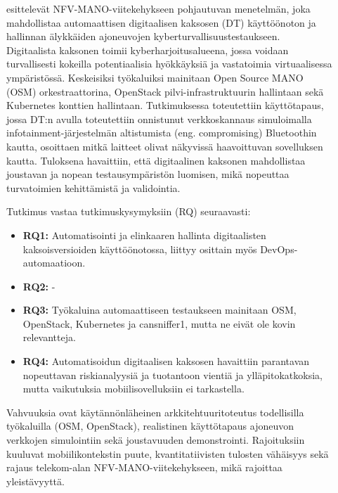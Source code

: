 \documentclass[bscthesis,finnish,oneside,biblatex]{uefcsthesis}
\begin{document}
    \begin{description}
        \item[\cite{grasselli2023_digitaltwin}] esittelevät NFV-MANO-viitekehykseen pohjautuvan menetelmän, joka mahdollistaa automaattisen digitaalisen kaksosen (DT) käyttöönoton ja hallinnan älykkäiden ajoneuvojen kyberturvallisuustestaukseen. Digitaalista kaksonen toimii kyberharjoitusalueena, jossa voidaan turvallisesti kokeilla potentiaalisia hyökkäyksiä ja vastatoimia virtuaalisessa ympäristössä. Keskeisiksi työkaluiksi mainitaan Open Source MANO (OSM) orkestraattorina, OpenStack pilvi-infrastruktuurin hallintaan sekä Kubernetes konttien hallintaan. Tutkimuksessa toteutettiin käyttötapaus, jossa DT:n avulla toteutettiin onnistunut verkkoskannaus simuloimalla infotainment-järjestelmän altistumista (eng. compromising) Bluetoothin kautta, osoittaen mitkä laitteet olivat näkyvissä haavoittuvan sovelluksen kautta. Tuloksena havaittiin, että digitaalinen kaksonen mahdollistaa joustavan ja nopean testausympäristön luomisen, mikä nopeuttaa turvatoimien kehittämistä ja validointia.

        Tutkimus vastaa tutkimuskysymyksiin (RQ) seuraavasti:
        \begin{itemize}
            \item \textbf{RQ1:} Automatisointi ja elinkaaren hallinta digitaalisten kaksoisversioiden käyttöönotossa, liittyy osittain myös DevOps-automaatioon. %
            \item \textbf{RQ2:} -
            \item \textbf{RQ3:} Työkaluina automaattiseen testaukseen mainitaan OSM, OpenStack, Kubernetes ja cansniffer1, mutta ne eivät ole kovin relevantteja.
            \item \textbf{RQ4:} Automatisoidun digitaalisen kaksosen havaittiin parantavan nopeuttavan riskianalyysiä ja tuotantoon vientiä ja ylläpitokatkoksia, mutta vaikutuksia mobiilisovelluksiin ei tarkastella.
        \end{itemize}

        Vahvuuksia ovat käytännönläheinen arkkitehtuuritoteutus todellisilla työkaluilla (OSM, OpenStack), realistinen käyttötapaus ajoneuvon verkkojen simulointiin sekä joustavuuden demonstrointi. Rajoituksiin kuuluvat mobiilikontekstin puute, kvantitatiivisten tulosten vähäisyys sekä rajaus telekom-alan NFV-MANO-viitekehykseen, mikä rajoittaa yleistävyyttä.
    \end{description}
\end{document}
